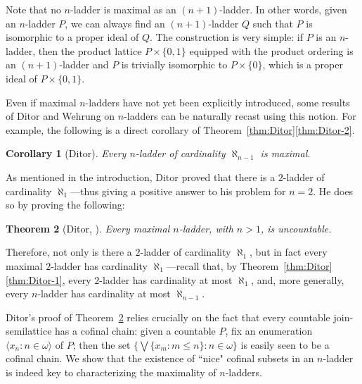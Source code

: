 \documentclass[]{amsart}
\newtheorem{theorem}{Theorem}[section]
\newtheorem{corollary}[theorem]{Corollary}
\theoremstyle{definition}
\theoremstyle{remark}
\begin{document}
Note that no $n$-ladder is maximal as an $(n+1)$-ladder. In other words, given an $n$-ladder $P$, we can always find an $(n+1)$-ladder $Q$ such that $P$ is isomorphic to a proper ideal of $Q$. The construction is very simple: if $P$ is an $n$-ladder, then the product lattice $P \times \{0,1\}$ equipped with the product ordering is an $(n+1)$-ladder and $P$ is trivially isomorphic to $P \times \{0\}$, which is a proper ideal of $P \times \{0,1\}$.

Even if maximal $n$-ladders have not yet been explicitly introduced, some results of Ditor and Wehrung on $n$-ladders can be naturally recast using this notion. For example, the following is a direct corollary of Theorem~\ref{thm:Ditor}\ref{thm:Ditor-2}.

\begin{corollary}[Ditor]\label{cor:ditornomax}
Every $n$-ladder of cardinality $\aleph_{n-1}$ is maximal.
\end{corollary}

As mentioned in the introduction, Ditor proved that there is a $2$-ladder of cardinality $\aleph_1$---thus giving a positive answer to his problem for $n = 2$. He does so by proving the following:
\begin{theorem}[{Ditor, \cite[\S 6.2]{MR0732199}}]\label{thm:Ditormax}
Every maximal $n$-ladder, with $n > 1$, is uncountable.
\end{theorem}
Therefore, not only is there a $2$-ladder of cardinality $\aleph_1$, but in fact every maximal $2$-ladder has cardinality $\aleph_1$---recall that, by Theorem~\ref{thm:Ditor}\ref{thm:Ditor-1}, every $2$-ladder has cardinality at most $\aleph_{1}$, and, more generally, every $n$-ladder has cardinality at most $\aleph_{n-1}$.

Ditor's proof of Theorem~\ref{thm:Ditormax} relies crucially on the fact that every countable join-semilattice has a cofinal chain: given a countable $P$, fix an enumeration $\langle x_n : n\in\omega\rangle$ of $P$; then the set $\{\bigvee \{x_m : m \le n\} : n\in\omega\}$ is easily seen to be a cofinal chain. We show that the existence of ``nice" cofinal subsets in an $n$-ladder is indeed key to characterizing the maximality of $n$-ladders.
\end{document}
